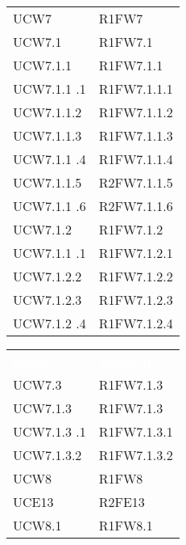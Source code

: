 \begin{table}[H]
\begin{tabular}[t]{ m{}<{\centering}  m{}<{\centering} }
	UCW7 & R1FW7 \\	
	
	UCW7.1 &  R1FW7.1 \\

	UCW7.1.1 & R1FW7.1.1 \\
	
	UCW7.1.1	.1 & R1FW7.1.1.1 \\
	
	UCW7.1.1.2 & R1FW7.1.1.2  \\
	
	UCW7.1.1.3 & R1FW7.1.1.3 \\

	UCW7.1.1	.4 & R1FW7.1.1.4 \\
	
	UCW7.1.1.5 & R2FW7.1.1.5 \\
	
	UCW7.1.1	.6 & R2FW7.1.1.6 \\

	UCW7.1.2 & R1FW7.1.2 \\

	UCW7.1.1	.1 & R1FW7.1.2.1 \\
	
	UCW7.1.2.2 & R1FW7.1.2.2  \\
	
	UCW7.1.2.3 & R1FW7.1.2.3 \\

	UCW7.1.2	.4 & R1FW7.1.2.4 \\

\end{tabular}
\begin{tabular}[t]{ m{}<{\centering}  m{}<{\centering} }
	\rowcolor{darkblue}
	\textcolor{white}{\textbf{Fonte}} &\textcolor{white}{\textbf{Requisiti}}\\ 

	UCW7.3 & R1FW7.1.3  \\

	UCW7.1.3 & R1FW7.1.3 \\

	UCW7.1.3	.1 & R1FW7.1.3.1 \\
	
	UCW7.1.3.2	& R1FW7.1.3.2 \\	
	
	UCW8 & R1FW8 \\		
	
	UCE13 & R2FE13  \\	
	 
	UCW8.1 & R1FW8.1 \\		 
	 

\end{tabular}
\end{table}
